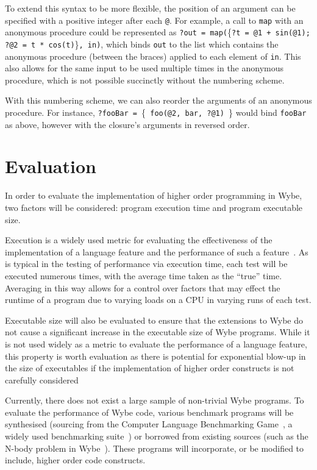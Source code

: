 To extend this syntax to be more flexible, the position of an argument can be specified with a positive integer after each \texttt{@}. For example, a call to \texttt{map} with an anonymous procedure could be represented as \texttt{?out = map(}\{\texttt{?t = @1 + sin(@1); ?@2 = t * cos(t)}\}\texttt{, in)}, which binds \texttt{out} to the list which contains the anonymous procedure (between the braces) applied to each element of \texttt{in}. This also allows for the same input to be used multiple times in the anonymous procedure, which is not possible succinctly without the numbering scheme.

With this numbering scheme, we can also reorder the arguments of an anonymous procedure. For instance, \texttt{?fooBar = }\{\texttt{ foo(@2, bar, ?@1) }\} would bind \texttt{fooBar} as above, however with the closure's arguments in reversed order.

\section{Evaluation}
\label{sec:plan-evaluation}

In order to evaluate the implementation of higher order programming in Wybe, two factors will be considered: program execution time and program executable size.

Execution is a widely used metric for evaluating the effectiveness of the implementation of a language feature and the performance of such a feature~\cite{chen2020multiple,xu2017fusing,leissa2015graph}. As is typical in the testing of performance via execution time, each test will be executed numerous times, with the average time taken as the ``true'' time. Averaging in this way allows for a control over factors that may effect the runtime of a program due to varying loads on a CPU in varying runs of each test.

Executable size will also be evaluated to ensure that the extensions to Wybe do not cause a significant increase in the executable size of Wybe programs. While it is not used widely as a metric to evaluate the performance of a language feature, this property is worth evaluation as there is potential for exponential blow-up in the size of executables if the implementation of higher order constructs is not carefully considered

Currently, there does not exist a large sample of non-trivial Wybe programs. To evaluate the performance of Wybe code, various benchmark programs will be synthesised (sourcing from the Computer Language Benchmarking Game~\cite{guoy2000computer}, a widely used benchmarking suite~\cite{chen2020multiple,leissa2015graph}) or borrowed from existing sources (such as the N-body problem in Wybe~\cite{chen2020multiple}). These programs will incorporate, or be modified to include, higher order code constructs.

